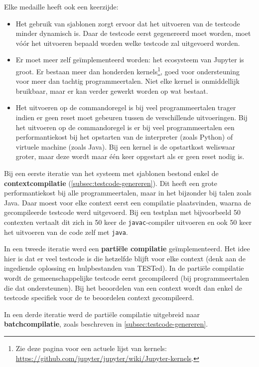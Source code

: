 Elke medaille heeft ook een keerzijde:
\begin{itemize}
    \item Het gebruik van sjablonen zorgt ervoor dat het uitvoeren van de testcode minder dynamisch is.
    Daar de testcode eerst gegenereerd moet worden, moet vóór het uitvoeren bepaald worden welke testcode zal uitgevoerd worden.
    \item Er moet meer zelf geïmplementeerd worden: het ecosysteem van Jupyter is groot.
    Er bestaan meer dan honderden kernels\footnote{Zie deze pagina voor een actuele lijst van kernels: \url{https://github.com/jupyter/jupyter/wiki/Jupyter-kernels}.}, goed voor ondersteuning voor meer dan tachtig programmeertalen.
    Niet elke kernel is onmiddellijk bruikbaar, maar er kan verder gewerkt worden op wat bestaat.
    \item Het uitvoeren op de commandoregel is bij veel programmeertalen trager indien er geen reset moet gebeuren tussen de verschillende uitvoeringen.
    Bij het uitvoeren op de commandoregel is er bij veel programmeertalen een performantiekost bij het opstarten van de interpreter (zoals Python) of virtuele machine (zoals Java).
    Bij een kernel is de opstartkost weliswaar groter, maar deze wordt maar één keer opgestart als er geen reset nodig is.
\end{itemize}

Bij een eerste iteratie van het systeem met sjablonen bestond enkel de \textbf{contextcompilatie} (\cref{subsec:testcode-genereren}).
Dit heeft een grote performantiekost bij alle programmeertalen, maar in het bijzonder bij talen zoals Java.
Daar moest voor elke context eerst een compilatie plaatsvinden, waarna de gecompileerde testcode werd uitgevoerd.
Bij een testplan met bijvoorbeeld 50 contexten vertaalt dit zich in 50 keer de \texttt{javac}-compiler uitvoeren en ook 50 keer het uitvoeren van de code zelf met \texttt{java}.

In een tweede iteratie werd een \textbf{partiële compilatie} geïmplementeerd.
Het idee hier is dat er veel testcode is die hetzelfde blijft voor elke context (denk aan de ingediende oplossing en hulpbestanden van TESTed).
In de partiële compilatie wordt de gemeenschappelijke testcode eerst gecompileerd (bij programmeertalen die dat ondersteunen).
Bij het beoordelen van een context wordt dan enkel de testcode specifiek voor de te beoordelen context gecompileerd.

In een derde iteratie werd de partiële compilatie uitgebreid naar \textbf{batchcompilatie}, zoals beschreven in \cref{subsec:testcode-genereren}.


